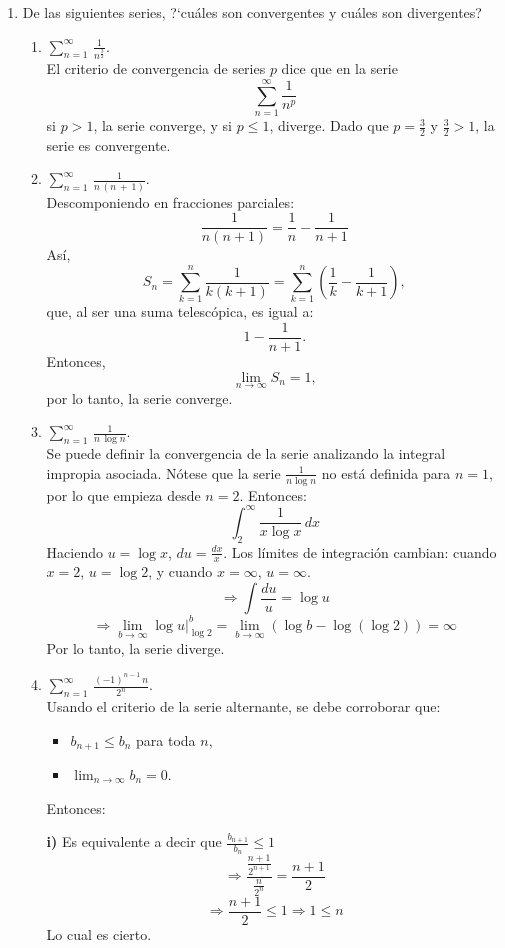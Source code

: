 \documentclass{article}
\begin{document}
\begin{enumerate}
\item De las siguientes series, ?`cu\'ales son convergentes y cu\'ales son divergentes?
\begin{enumerate}
\item $\displaystyle\sum_{n=1}^{\infty}\,\frac{1}{n^{\frac{3}{2}}}$.
\[\]
El criterio de convergencia de series \( p \) dice que en la serie
\[
\sum_{n=1}^{\infty} \frac{1}{n^p}
\]
si \( p > 1 \), la serie converge, y si \( p \leq 1 \), diverge. Dado que \( p = \frac{3}{2} \) y \( \frac{3}{2} > 1 \), la serie es convergente.


\item $\displaystyle\sum_{n=1}^{\infty}\,\frac{1}{n\,(n\,+\,1)}$.
\[\]
Descomponiendo en fracciones parciales:
\[
\frac{1}{n(n+1)} = \frac{1}{n} - \frac{1}{n+1}
\]
Así, 
\[
S_n = \sum_{k=1}^{n} \frac{1}{k(k+1)} = \sum_{k=1}^{n} \left( \frac{1}{k} - \frac{1}{k+1} \right),
\]
que, al ser una suma telescópica, es igual a:
\[
1 - \frac{1}{n+1}.
\]
Entonces,
\[
\lim_{n \to \infty} S_n = 1,
\]
por lo tanto, la serie converge.

\item $\displaystyle\sum_{n=1}^{\infty}\,\frac{1}{n\,\log n}$.
\[\]
Se puede definir la convergencia de la serie analizando la integral impropia asociada. Nótese que la serie \( \frac{1}{n \log n} \) no está definida para \( n = 1 \), por lo que empieza desde \( n = 2 \). Entonces:
\[
\int_{2}^{\infty} \frac{1}{x \log x} \, dx
\]
Haciendo \( u = \log x \), \( du = \frac{dx}{x} \). Los límites de integración cambian: cuando \( x = 2 \), \( u = \log 2 \), y cuando \( x = \infty \), \( u = \infty \).
\[
\Rightarrow \int \frac{du}{u} = \log u
\]
\[
\Rightarrow \lim_{b \to \infty} \log u \bigg|_{\log 2}^{b} = \lim_{b \to \infty} \left( \log b - \log (\log 2) \right) = \infty
\]
Por lo tanto, la serie diverge.

\item $\displaystyle\sum_{n=1}^{\infty}\,\frac{(-1)^{n-1}\,n}{2^n}$.
\[\]
Usando el criterio de la serie alternante, se debe corroborar que: 
\begin{itemize}
    \item[i)] \( b_{n+1} \leq b_n \) para toda \( n \),
    \item[ii)] \( \lim_{n \to \infty} b_n = 0 \).
\end{itemize}
Entonces:

\textbf{i)} Es equivalente a decir que \( \frac{b_{n+1}}{b_n} \leq 1 \)
\[
\Rightarrow \frac{\frac{n+1}{2^{n+1}}}{\frac{n}{2^n}} = \frac{n+1}{2}
\]
\[
\Rightarrow \frac{n+1}{2} \leq 1 \Rightarrow 1 \leq n
\]
Lo cual es cierto.


\end{enumerate}
\end{enumerate}
\end{document}
